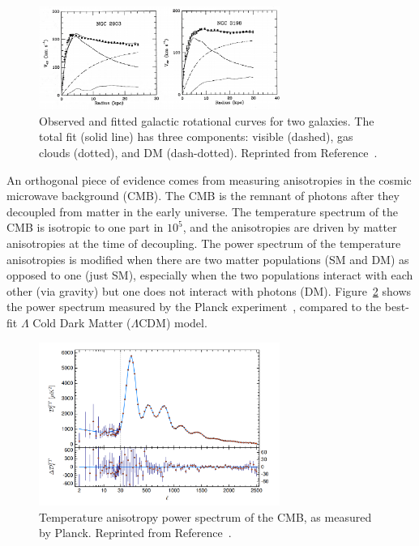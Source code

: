 \begin{figure}[]
\begin{center}
    \includegraphics[width=0.7\textwidth]{figures/theory/dm_rot.png}
    \caption{Observed and fitted galactic rotational curves for two galaxies.
             The total fit (solid line) has three components: visible (dashed), gas clouds (dotted), and DM (dash-dotted). 
             Reprinted from Reference~\cite{dmrot}.}
    \label{fig:theory:dm_rot}
\end{center}
\end{figure}

An orthogonal piece of evidence comes from measuring anisotropies in the cosmic microwave background (CMB).
The CMB is the remnant of photons after they decoupled from matter in the early universe.
The temperature spectrum of the CMB is isotropic to one part in $10^5$, and the anisotropies are driven by matter anisotropies at the time of decoupling.
The power spectrum of the temperature anisotropies is modified when there are two matter populations (SM and DM) as opposed to one (just SM), especially when the two populations interact with each other (via gravity) but one does not interact with photons (DM).
Figure~\ref{fig:theory:planck} shows the power spectrum measured by the Planck experiment~\cite{planck}, compared to the best-fit $\Lambda$ Cold Dark Matter ($\Lambda$CDM) model.

\begin{figure}[]
\begin{center}
    \includegraphics[width=0.7\textwidth]{figures/theory/planck.png}
    \caption{Temperature anisotropy power spectrum of the CMB, as measured by Planck.
             Reprinted from Reference~\cite{planck}.}
    \label{fig:theory:planck}
\end{center}
\end{figure}

